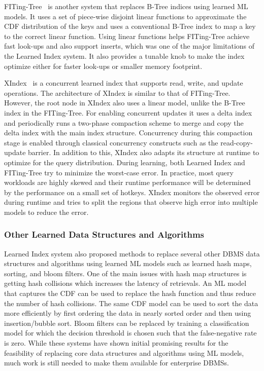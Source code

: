 FITing-Tree~\cite{fitingtree} is another system that replaces B-Tree indices using learned ML models.
It uses a set of piece-wise disjoint linear functions to approximate the CDF distribution of the keys and uses a conventional B-Tree index to map a key to the correct linear function.
Using linear functions helps FITing-Tree achieve fast look-ups and also support inserts, which was one of the major limitations of the Learned Index system.
It also provides a tunable knob to make the index optimize either for faster look-ups or smaller memory footprint.

XIndex~\cite{xindex} is a concurrent learned index that supports read, write, and update operations.
The architecture of XIndex is similar to that of FITing-Tree.
However, the root node in XIndex also uses a linear model, unlike the B-Tree index in the FITing-Tree.
For enabling concurrent updates it uses a delta index and periodically runs a two-phase compaction scheme to merge and copy the delta index with the main index structure.
Concurrency during this compaction stage is enabled through classical concurrency constructs such as the read-copy-update barrier.
In addition to this, XIndex also adapts its structure at runtime to optimize for the query distribution.
During learning, both Learned Index and FITing-Tree try to minimize the worst-case error.
In practice, most query workloads are highly skewed and their runtime performance will be determined by the performance on a small set of hotkeys.
XIndex monitors the observed error during runtime and tries to split the regions that observe high error into multiple models to reduce the error.

\subsubsection{Other Learned Data Structures and Algorithms}
Learned Index system also proposed methods to replace several other DBMS data structures and algorithms using learned ML models such as learned hash maps, sorting, and bloom filters.
One of the main issues with hash map structures is getting hash collisions which increases the latency of retrievals.
An ML model that captures the CDF can be used to replace the hash function and thus reduce the number of hash collisions.
The same CDF model can be used to sort the data more efficiently by first ordering the data in nearly sorted order and then using insertion/bubble sort.
Bloom filters can be replaced by training a classification model for which the decision threshold is chosen such that the false-negative rate is zero.
While these systems have shown initial promising results for the feasibility of replacing core data structures and algorithms using ML models, much work is still needed to make them available for enterprise DBMSs.